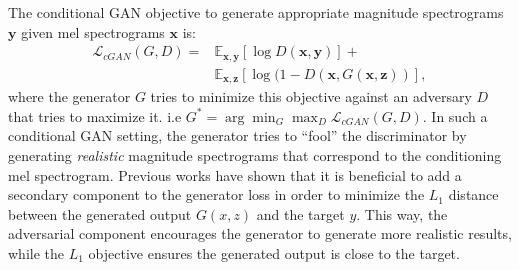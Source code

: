 \documentclass[a4paper]{article}
\begin{document}


The conditional GAN objective to generate appropriate magnitude spectrograms $\bm{y}$ given mel spectrograms $\bm{x}$ is:
\begin{align}
    \mathcal{L}_{\mathit{cGAN}}(G,D) = &\mathbb{E}_{\bm{x},\bm{y}}[\log D(\bm{x},\bm{y})] + \nonumber \\
                 &\mathbb{E}_{\bm{x},\bm{z}}[\log (1-D(\bm{x},G(\bm{x},\bm{z}))],\label{cGAN_equation}
\end{align}
where the generator $G$ tries to minimize this objective against an adversary $D$ that tries to maximize it. i.e $G^*  = \arg\min_G \max_D \mathcal{L}_{\mathit{cGAN}}(G,D)$. 
In such a conditional GAN setting, 
the generator tries to ``fool'' the discriminator by generating \textit{realistic} magnitude spectrograms that correspond to the conditioning mel spectrogram.  
Previous works \cite{pix2pix,segan}  have shown that it is beneficial to add a secondary component to the generator loss in order to minimize the $L_1$ distance between the generated output $G(x,z)$ and the target $y$.
This way, the adversarial component encourages the generator to generate more realistic results,  while the $L_1$ objective ensures the generated output is close to the target.
\end{document}
